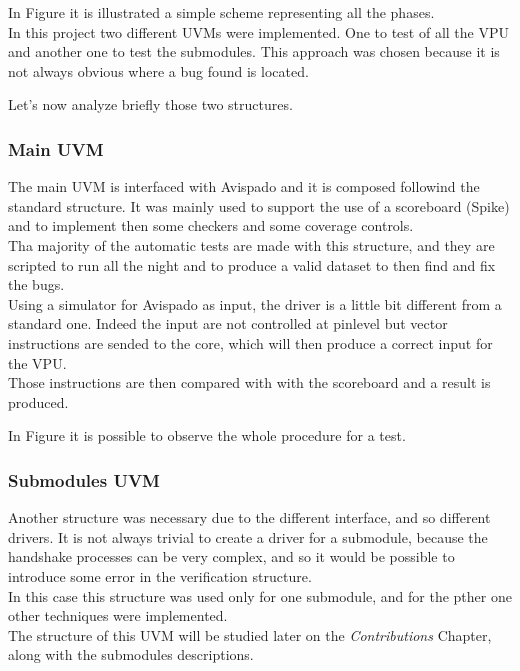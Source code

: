 In Figure %
it is illustrated a simple scheme representing all the phases.\\

In this project two different UVMs were implemented. One to test of all the VPU and another one to test the submodules. This approach was chosen because it is not always obvious where a bug found is located.

Let's now analyze briefly those two structures.
\subsubsection{Main UVM}
The main UVM is interfaced with Avispado and it is composed followind the standard structure. It was mainly used to support the use of a scoreboard (Spike) and to implement then some checkers and some coverage controls.\\

Tha majority of the automatic tests are made with this structure, and they are scripted to run all the night and to produce a valid dataset to then find and fix the bugs.\\

Using a simulator for Avispado as input, the driver is a little bit different from a standard one. Indeed the input are not controlled at pinlevel but vector instructions are sended to the core, which will then produce a correct input for the VPU.\\

Those instructions are then compared with with the scoreboard and a result is produced.

In Figure 
it is possible to observe the whole procedure for a test.



\subsubsection{Submodules UVM}

Another structure was necessary due to the different interface, and so different drivers. It is not always trivial to create a driver for a submodule, because the handshake processes can be very complex, and so it would be possible to introduce some error in the verification structure.\\

In this case this structure was used only for one submodule, and for the pther one other techniques were implemented.\\

The structure of this UVM will be studied later on the \textit{Contributions} Chapter, along with the submodules descriptions.
